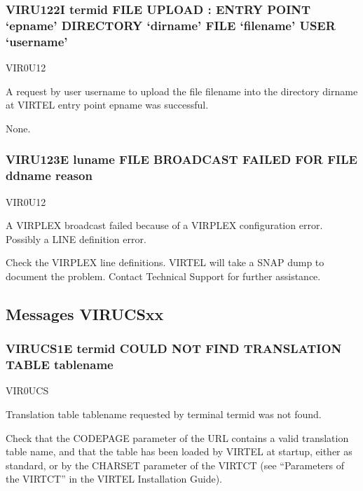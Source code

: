 \documentclass[letterpaper,10pt,english]{sphinxmanual}
\begin{document}
\subsubsection{VIRU122I termid FILE UPLOAD : ENTRY POINT ‘epname’ DIRECTORY ‘dirname’ FILE ‘filename’ USER ‘username’}
\label{\detokenize{messages:viru122i-termid-file-upload-entry-point-epname-directory-dirname-file-filename-user-username}}\begin{description}
\sphinxAtStartPar
VIR0U12

\sphinxAtStartPar
A request by user username to upload the file filename into the directory dirname at VIRTEL entry point epname was successful.

\sphinxAtStartPar
None.

\end{description}


\subsubsection{VIRU123E luname FILE BROADCAST FAILED FOR FILE ddname reason}
\label{\detokenize{messages:viru123e-luname-file-broadcast-failed-for-file-ddname-reason}}\begin{description}
\sphinxAtStartPar
VIR0U12

\sphinxAtStartPar
A VIRPLEX broadcast failed because of a VIRPLEX configuration error. Possibly a LINE definition error.

\sphinxAtStartPar
Check the VIRPLEX line definitions. VIRTEL will take a SNAP dump to document the problem. Contact Technical Support for further assistance.

\end{description}


\subsection{Messages VIRUCSxx}
\label{\detokenize{messages:messages-virucsxx}}

\subsubsection{VIRUCS1E termid COULD NOT FIND TRANSLATION TABLE tablename}
\label{\detokenize{messages:virucs1e-termid-could-not-find-translation-table-tablename}}\begin{description}
\sphinxAtStartPar
VIR0UCS

\sphinxAtStartPar
Translation table tablename requested by terminal termid was not found.

\sphinxAtStartPar
Check that the CODEPAGE parameter of the URL contains a valid translation table name, and that the table has been loaded by VIRTEL at startup, either as standard, or by the CHARSET parameter of the VIRTCT (see “Parameters of the VIRTCT” in the VIRTEL Installation Guide).

\end{description}
\end{document}
